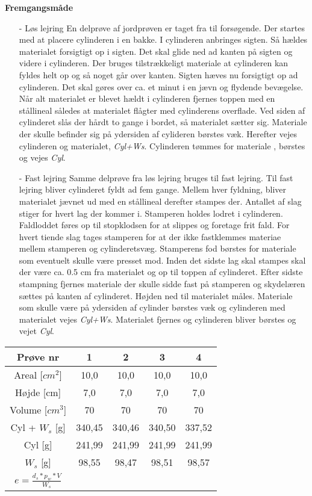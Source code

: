 \textbf{Fremgangsmåde}
\begin{itemize}
	\item[-] Løs lejring
En delprøve af jordprøven er taget fra til forsøgende. Der startes med at placere cylinderen i en bakke. I cylinderen anbringes sigten. Så hældes materialet forsigtigt  op i sigten. Det skal glide ned ad kanten på sigten og videre i cylinderen. Der bruges tilstrækkeligt materiale at cylinderen kan fyldes helt op og så noget går over kanten. Sigten hæves nu forsigtigt op ad cylinderen. Det skal gøres over ca. et minut  i en jævn og flydende bevægelse. Når alt materialet er blevet hældt i cylinderen fjernes toppen med en stållineal således at materialet flågter med cylinderens overflade. Ved siden af cylinderet slås der hårdt to gange i bordet, så materialet sætter sig. Materiale der skulle befinder sig på ydersiden af cylideren børstes væk. Herefter vejes cylinderen og materialet, \textit{Cyl+Ws}. Cylinderen tømmes for materiale , børstes og vejes \textit{Cyl}.
	\item[-] Fast lejring
Samme delprøve fra løs lejring bruges til fast lejring. Til fast lejring bliver cylinderet fyldt ad fem gange. Mellem hver fyldning, bliver materialet jævnet ud med en stållineal derefter stampes der. Antallet af slag stiger for hvert lag der kommer i. Stamperen holdes lodret i cylinderen. Faldloddet føres op til stopklodsen for at slippes og foretage frit fald. For hvert tiende slag tages stamperen for at der ikke fastklemmes materiae mellem stamperen og cylinderetsvæg. Stamperens fod børstes for materiale som eventuelt skulle være presset mod. Inden det sidste lag skal stampes skal der være ca. 0.5 cm fra materialet og op til toppen af cylinderet. Efter sidste stampning fjernes materiale der skulle sidde fast på stamperen og skydelæren sættes på kanten af cylinderet. Højden ned til materialet måles. Materiale som skulle være på ydersiden af cylinder børstes væk og cylinderen med materialet vejes \textit{Cyl+Ws}. Materialet fjernes og cylinderen bliver børstes og vejet \textit{Cyl}.
\end{itemize}



\begin{center}
	\begin{tabular}{ |c|c|c|c|c| } 
		\hline
		Prøve nr & 1 & 2 & 3 & 4 \\	\hline 
		Areal [$cm^2$] & 10,0 & 10,0 & 10,0 & 10,0 \\ \hline
		Højde [cm] & 7,0 & 7,0 & 7,0 & 7,0 \\ \hline
		Volume [$cm^3$] & 70 & 70 & 70 & 70 \\ \hline
		Cyl + $W_s$ [g] & 340,45 & 340,46 & 340,50 & 337,52 \\ \hline
		Cyl [g] & 241,99 & 241,99 & 241,99 & 241,99 \\ \hline
		$W_s$ [g] & 98,55 & 98,47 & 98,51 & 98,57 \\ \hline
		$e=\frac{d_s*p_w*V}{W_s}$ & & & &
		\hline
	\end{tabular}
\end{center}

